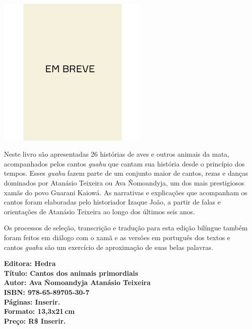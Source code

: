 \begin{center}
\hspace*{.5cm}\includegraphics[width=74mm]{./CAPAS/breve.jpeg}
\end{center}
\hspace*{-7cm}\hrulefill\hspace*{-7cm}
\medskip

\noindent{}Neste livro são apresentadas 26 histórias de aves e outros animais da mata, acompanhados pelos cantos \textit{guahu} que cantam sua história desde o princípio dos tempos. Esses \textit{guahu} fazem parte de um conjunto maior de cantos, rezas e danças dominados por Atanásio Teixeira ou Ava Ñomoandyja, um dos mais prestigiosos xamãs do povo Guarani Kaiowá. As narrativas e explicações que acompanham os cantos foram elaboradas pelo historiador Izaque João, a partir de falas e orientações de Atanásio Teixeira ao longo dos últimos seis anos. 

Os processos de seleção, transcrição e tradução para esta edição bilíngue também foram feitos em diálogo com o xamã e as versões em português dos textos e cantos \textit{guahu} são um exercício de aproximação de suas belas palavras.

\vfill
\noindent\begin{minipage}[c]{1\linewidth}
{\small\textbf{
\hspace*{-.1cm}Editora: Hedra\\
Título: Cantos dos animais primordiais\\
Autor: Ava Ñomoandyja Atanásio Teixeira\\ 
ISBN: 978-65-89705-30-7\\
Páginas: Inserir.\\
Formato: 13,3x21\,cm\\
Preço: R\$ Inserir.\\
}}
\end{minipage}
\pagebreak

